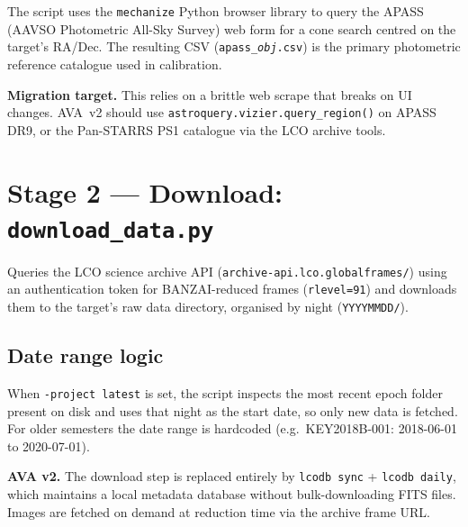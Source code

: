 \documentclass[12pt,a4paper]{article}
\begin{document}
The script uses the \texttt{mechanize} Python browser library to query the APASS
(AAVSO Photometric All-Sky Survey) web form for a cone search centred on the target's
RA/Dec.  The resulting CSV (\texttt{apass\_\hspace{0pt}\textit{obj}.csv}) is the primary photometric
reference catalogue used in calibration.

\begin{warnbox}
\textbf{Migration target.}  This relies on a brittle web scrape that breaks on UI
changes.  AVA~v2 should use \texttt{astroquery.vizier.query\_\hspace{0pt}region()} on APASS\,DR9,
or the Pan-STARRS PS1 catalogue via the LCO archive tools.
\end{warnbox}

\section{Stage 2 --- Download: \texorpdfstring{\texttt{download\_data.py}}{download_data.py}}
\label{sec:download}

Queries the LCO science archive API (\texttt{archive-api.lco.global\/\hspace{0pt}frames/\hspace{0pt}}) using an
authentication token for BANZAI-reduced frames (\texttt{rlevel=91}) and downloads them
to the target's raw data directory, organised by night (\texttt{YYYYMMDD/}).

\subsection{Date range logic}

When \texttt{-project latest} is set, the script inspects the most recent epoch folder
present on disk and uses that night as the start date, so only new data is fetched.  For
older semesters the date range is hardcoded (e.g.\ KEY2018B-001: 2018-06-01 to
2020-07-01).

\begin{notebox}
\textbf{AVA v2.}  The download step is replaced entirely by \texttt{lcodb sync} +
\texttt{lcodb daily}, which maintains a local metadata database without bulk-downloading
FITS files.  Images are fetched on demand at reduction time via the archive frame URL.
\end{notebox}
\end{document}
